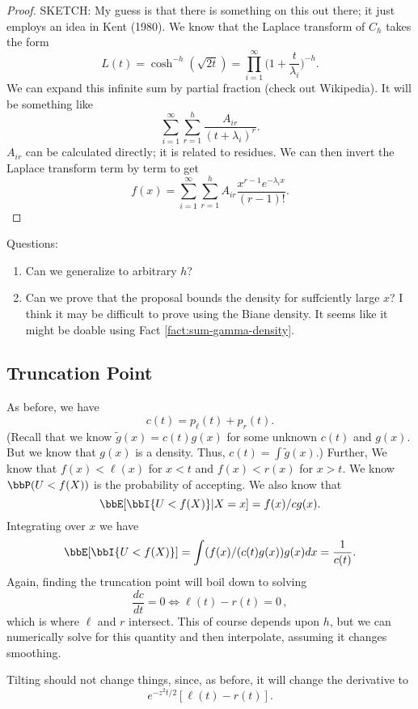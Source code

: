 \documentclass[12pt]{article}
\begin{document}
\begin{proof}
  SKETCH: My guess is that there is something on this out there; it just employs
  an idea in Kent (1980).
We know that the Laplace transform of $C_h$ takes the form
\[
L(t) = \cosh^{-h}(\sqrt{2 t}) = \prod_{i=1}^\infty \Big(1 +
\frac{t}{\lambda_i}\Big)^{-h}.
\]
We can expand this infinite sum by partial fraction (check out Wikipedia).  It
will be something like
\[
\sum_{i=1}^\infty \sum_{r=1}^h \frac{A_{ir}}{(t + \lambda_i)^r}.
\]
$A_{ir}$ can be calculated directly; it is related to residues.
We can then invert the Laplace transform term by term to get
\[
f(x) = \sum_{i=1}^\infty \sum_{r=1}^h A_{ir} \frac{x^{r-1} e^{-\lambda_i
    x}}{(r-1)!}.
\]
\end{proof}

Questions:
\begin{enumerate}
\item Can we generalize to arbitrary $h$?
\item Can we prove that the proposal bounds the density for suffciently large
  $x$?  I think it may be difficult to prove using the Biane density.  It seems
  like it might be doable using Fact \ref{fact:sum-gamma-density}.
\end{enumerate}

\subsection{Truncation Point}

As before, we have
\[
c(t) = p_\ell(t) + p_r(t).
\]
(Recall that we know $\tilde g(x) = c(t) g(x)$ for some unknown $c(t)$ and
$g(x)$.  But we know that $g(x)$ is a density.  Thus, $c(t) = \int \tilde
g(x)$.)  Further, We know that $f(x) < \ell(x)$ for $x < t$ and $f(x) < r(x)$
for $x > t$.  We know $\bbP(U < f(X))$ is the probability of accepting.  We also
know that
\[
\bbE[ \bbI \{U < f(X)\} | X=x] = f(x) / c g(x).
\]
Integrating over $x$ we have
\[
\bbE[ \bbI \{ U < f(X) \} ] = \int( f(x) / (c(t) g(x)) g(x) dx = \frac{1}{c(t)}.
\]
Again, finding the truncation point will boil down to solving
\[
\frac{dc}{dt} = 0 \iff \ell(t) - r(t) = 0 \, ,
\]
which is where $\ell$ and $r$ intersect.  This of course depends upon $h$, but
we can numerically solve for this quantity and then interpolate, assuming it
changes smoothing.

Tilting should not change things, since, as before, it will change the
derivative to
\[
e^{-z^2 t/ 2} [ \ell(t) - r(t) ].
\]
\end{document}
